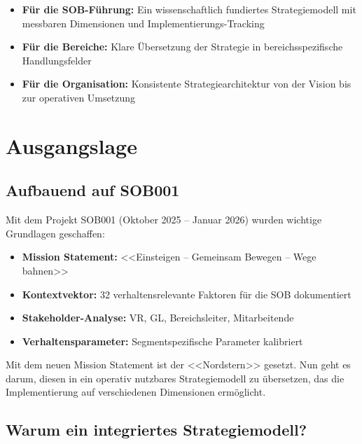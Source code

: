 \documentclass{fehradvice-report}
\begin{document}
\begin{itemize}
    \item \textbf{Für die SOB-Führung:} Ein wissenschaftlich fundiertes Strategiemodell mit messbaren Dimensionen und Implementierungs-Tracking
    \item \textbf{Für die Bereiche:} Klare Übersetzung der Strategie in bereichsspezifische Handlungsfelder
    \item \textbf{Für die Organisation:} Konsistente Strategiearchitektur von der Vision bis zur operativen Umsetzung
\end{itemize}

\newpage
\section{Ausgangslage}

\subsection{Aufbauend auf SOB001}

Mit dem Projekt SOB001 (Oktober 2025 -- Januar 2026) wurden wichtige Grundlagen geschaffen:

\begin{itemize}
    \item \textbf{Mission Statement:} <<Einsteigen -- Gemeinsam Bewegen -- Wege bahnen>>
    \item \textbf{Kontextvektor:} 32 verhaltensrelevante Faktoren für die SOB dokumentiert
    \item \textbf{Stakeholder-Analyse:} VR, GL, Bereichsleiter, Mitarbeitende
    \item \textbf{Verhaltensparameter:} Segmentspezifische Parameter kalibriert
\end{itemize}

\begin{fainfobox}
Mit dem neuen Mission Statement ist der <<Nordstern>> gesetzt. Nun geht es darum, diesen in ein operativ nutzbares Strategiemodell zu übersetzen, das die Implementierung auf verschiedenen Dimensionen ermöglicht.
\end{fainfobox}

\subsection{Warum ein integriertes Strategiemodell?}
\end{document}
